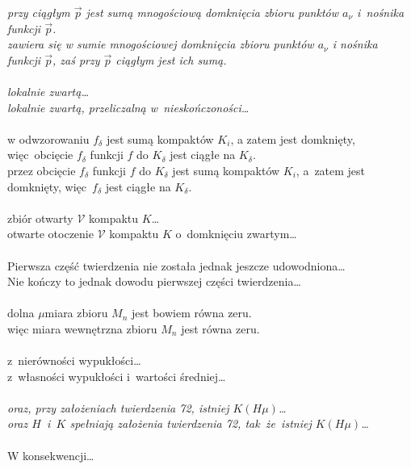 \documentclass[a4paper,11pt]{article}
\begin{document}
 \Jest \emph{przy ciągłym $\vec{ p }$ jest sumą
  mnogościową domknięcia
  zbioru punktów $a_{ \nu }$ i~nośnika funkcji $\vec{ p }$.} \\
\Pow \emph{zawiera się w sumie mnogościowej domknięcia zbioru punktów
  $a_{ \nu }$ i nośnika funkcji $\vec{ p }$, zaś przy $\vec{ p }$
  ciągłym
  jest ich sumą.} \\
 \\
\Jest \emph{lokalnie zwartą\ldots} \\
\Pow \emph{lokalnie zwartą, przeliczalną w~nieskończoności\ldots} \\
 \\
\Jest w odwzorowaniu $f_{ \delta }$ jest sumą kompaktów $K_{ i }$, a zatem jest domknięty, więc~obcięcie $f_{ \delta }$ funkcji $f$ do $K_{ \delta }$ jest ciągłe na $K_{ \delta }$. \\
\Pow przez obcięcie $f_{ \delta }$ funkcji $f$ do $K_{ \delta }$ jest
sumą kompaktów $K_{ i }$, a~zatem jest domknięty, więc~$f_{ \delta }$
jest
ciągłe na $K_{ \delta }$. \\
 \\
\Jest zbiór otwarty $\mathcal{V}$ kompaktu $K$\ldots \\
\Pow otwarte otoczenie $\mathcal{V}$ kompaktu $K$ o~domknięciu
zwartym\ldots \\
 \\
\Jest Pierwsza część twierdzenia nie została jednak jeszcze
udowodniona\ldots \\
\Pow Nie kończy to jednak dowodu pierwszej części twierdzenia\ldots \\
 \\
\Jest dolna $\mu$\dywiz miara zbioru $M_{ n }$ jest bowiem równa zeru. \\
\Pow więc miara wewnętrzna zbioru $M_{ n }$ jest równa zeru. \\
 \\
\Jest z~nierówności wypukłości\ldots\\
\Pow z~własności wypukłości i~wartości średniej\ldots \\
 \\
\Jest \emph{oraz, przy założeniach twierdzenia 72, istniej
  $K( H \mu )$\ldots} \\
\Pow \emph{oraz $H$~i~$K$ spełniają założenia twierdzenia 72, tak~że~istniej $K( H \mu )$\ldots}\\
 \\
\Jest W konsekwencji\ldots \\
\end{document}
